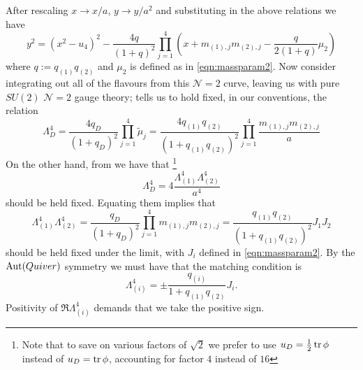 \documentclass[main.tex]{subfiles}
\begin{document}
After rescaling $x\to x/a$, $y\to y/{a^2}$ and substituting in the above relations we have
\begin{equation}\label{eqn:N2curve}
y^2=(x^2-u_4)^2-\frac{4q}{(1+q)^2}\prod_{j=1}^4\left(x+m_{(1),j}m_{(2),j}-\frac{q}{2(1+q)}\mu_2\right)
\end{equation}
where $q:=q_{(1)}q_{(2)}$ and $\mu_2$ is defined as in \eqref{eqn:massparam2}.
Now consider integrating out all of the flavours from this $\mathcal{N}=2$ curve, leaving us with pure $SU(2)$ $\mathcal{N}=2$ gauge theory; \cite{Argyres:1995wt} tells us to hold fixed, in our conventions, the relation
\begin{equation}
\Lambda^4_{D}=\frac{4q_{D}}{(1+q_{D})^2}\prod_{j=1}^4\tilde{\mu}_j=\frac{4q_{(1)}q_{(2)}}{(1+q_{(1)}q_{(2)})^2}\prod_{j=1}^4\frac{m_{(1),j}m_{(2),j}}{a}
\end{equation}
On the other hand, from \cite{Intriligator:1994sm} we have that \footnote{Note that to save on various factors of $\sqrt{2}$ we prefer to use $u_D=\frac{1}{2}\operatorname{tr}\phi$ instead of $u_D=\operatorname{tr}\phi$, accounting for factor $4$ instead of $16$}
\begin{equation}
\Lambda_{D}^4=4\frac{\Lambda^4_{(1)}\Lambda^4_{(2)}}{a^4}
\end{equation}
should be held fixed. Equating them implies that
\begin{equation}
\Lambda^4_{(1)}\Lambda^4_{(2)}=\frac{q_{D}}{(1+q_{D})^2}\prod_{j=1}^4m_{(1),j}m_{(2),j}=\frac{q_{(1)}q_{(2)}}{(1+q_{(1)}q_{(2)})^2}J_1J_2
\end{equation}
should be held fixed under the limit, with $J_i$ defined in \eqref{eqn:massparam2}.
By the $\operatorname{Aut}(Quiver)$ symmetry we must have that the matching condition is
\begin{equation}\label{eqn:matching}
\Lambda^4_{(i)}=\pm \frac{q_{(i)}}{1+q_{(1)}q_{(2)}}J_i.
\end{equation}
Positivity of $\Re\Lambda^4_{(i)}$ demands that we take the positive sign.
\end{document}
